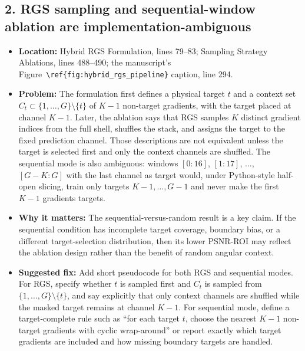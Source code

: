 \documentclass[11pt]{article}
\begin{document}
\subsection*{2. RGS sampling and sequential-window ablation are implementation-ambiguous}
\begin{itemize}
  \item \textbf{Location:} Hybrid RGS Formulation, lines 79--83; Sampling Strategy Ablations, lines 488--490; the manuscript's Figure~\texttt{\textbackslash ref\{fig:hybrid\_rgs\_pipeline\}} caption, line 294.
  \item \textbf{Problem:} The formulation first defines a physical target $t$ and a context set $C_t\subset\{1,\ldots,G\}\setminus\{t\}$ of $K-1$ non-target gradients, with the target placed at channel $K-1$. Later, the ablation says that RGS samples $K$ distinct gradient indices from the full shell, shuffles the stack, and assigns the target to the fixed prediction channel. Those descriptions are not equivalent unless the target is selected first and only the context channels are shuffled. The sequential mode is also ambiguous: windows $[0{:}16]$, $[1{:}17]$, $\ldots$, $[G-K{:}G]$ with the last channel as target would, under Python-style half-open slicing, train only targets $K-1,\ldots,G-1$ and never make the first $K-1$ gradients targets.
  \item \textbf{Why it matters:} The sequential-versus-random result is a key claim. If the sequential condition has incomplete target coverage, boundary bias, or a different target-selection distribution, then its lower PSNR-ROI may reflect the ablation design rather than the benefit of random angular context.
  \item \textbf{Suggested fix:} Add short pseudocode for both RGS and sequential modes. For RGS, specify whether $t$ is sampled first and $C_t$ is sampled from $\{1,\ldots,G\}\setminus\{t\}$, and say explicitly that only context channels are shuffled while the masked target remains at channel $K-1$. For sequential mode, define a target-complete rule such as ``for each target $t$, choose the nearest $K-1$ non-target gradients with cyclic wrap-around'' or report exactly which target gradients are included and how missing boundary targets are handled.
\end{itemize}
\end{document}
